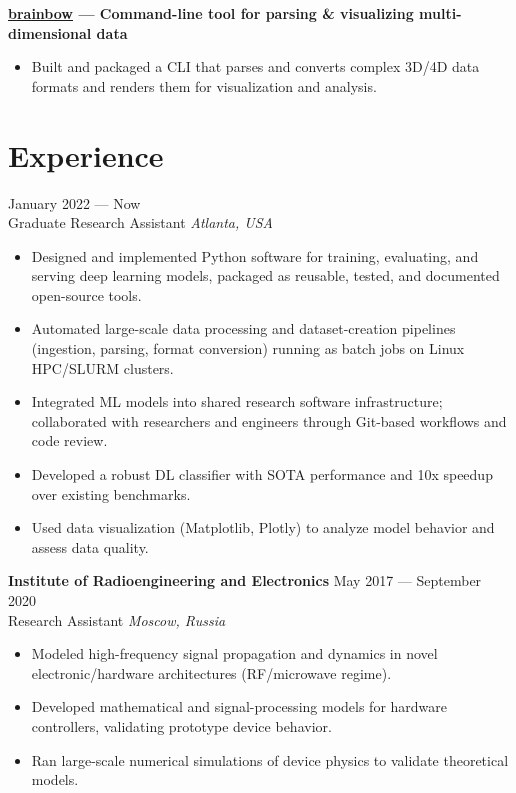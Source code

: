 \documentclass[11pt,a4paper]{article}
\begin{document}
\noindent\textbf{\href{https://pypi.org/project/brainbow/}{brainbow} --- Command-line tool for parsing \& visualizing multi-dimensional data}\\
[-2em]
\begin{itemize}[leftmargin=*,noitemsep]
    \item Built and packaged a CLI that parses and converts complex 3D/4D data formats and renders them for visualization and analysis.
\end{itemize}

\section*{Experience}
 \hfill January 2022 --- Now\\
Graduate Research Assistant \hfill \textit{Atlanta, USA}\\
[-2em]
\begin{itemize}[leftmargin=*,noitemsep]
    \item Designed and implemented Python software for training, evaluating, and serving deep learning models, packaged as reusable, tested, and documented open-source tools.
    \item Automated large-scale data processing and dataset-creation pipelines (ingestion, parsing, format conversion) running as batch jobs on Linux HPC/SLURM clusters.
    \item Integrated ML models into shared research software infrastructure; collaborated with researchers and engineers through Git-based workflows and code review.
    \item Developed a robust DL classifier with SOTA performance and 10x speedup over existing benchmarks.
    \item Used data visualization (Matplotlib, Plotly) to analyze model behavior and assess data quality.
\end{itemize}

\noindent\textbf{Institute of Radioengineering and Electronics} \hfill May 2017 --- September 2020\\
Research Assistant \hfill \textit{Moscow, Russia}\\
[-2em]
\begin{itemize}[leftmargin=*,noitemsep]
    \item Modeled high-frequency signal propagation and dynamics in novel electronic/hardware architectures (RF/microwave regime).
    \item Developed mathematical and signal-processing models for hardware controllers, validating prototype device behavior.
    \item Ran large-scale numerical simulations of device physics to validate theoretical models.
\end{itemize}
\end{document}

